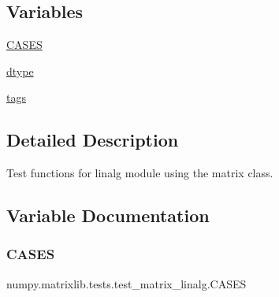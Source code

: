 \subsection*{Variables}
\begin{DoxyCompactItemize}
\item 
\hyperlink{namespacenumpy_1_1matrixlib_1_1tests_1_1test__matrix__linalg_a2da250ce6d1f2ad88fc9df8cf01b9c3d}{C\+A\+S\+ES}
\item 
\hyperlink{namespacenumpy_1_1matrixlib_1_1tests_1_1test__matrix__linalg_a2d76229ce4bcd40b7a801c641ef5bac6}{dtype}
\item 
\hyperlink{namespacenumpy_1_1matrixlib_1_1tests_1_1test__matrix__linalg_a7662486ae172d895dac590795866d07b}{tags}
\end{DoxyCompactItemize}


\subsection{Detailed Description}
\begin{DoxyVerb}Test functions for linalg module using the matrix class.\end{DoxyVerb}
 

\subsection{Variable Documentation}
\mbox{\label{namespacenumpy_1_1matrixlib_1_1tests_1_1test__matrix__linalg_a2da250ce6d1f2ad88fc9df8cf01b9c3d}} 
\subsubsection{\texorpdfstring{C\+A\+S\+ES}{CASES}}
{\footnotesize\ttfamily numpy.\+matrixlib.\+tests.\+test\+\_\+matrix\+\_\+linalg.\+C\+A\+S\+ES}

\mbox{\label{namespacenumpy_1_1matrixlib_1_1tests_1_1test__matrix__linalg_a2d76229ce4bcd40b7a801c641ef5bac6}} 
